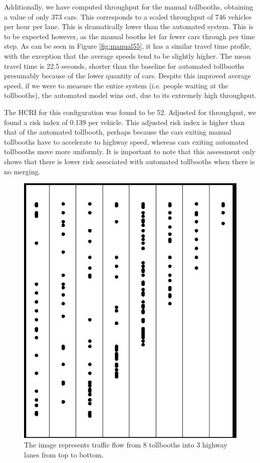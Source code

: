 \documentclass[a4paper, 11pt]{article}
\begin{document}
Additionally, we have computed throughput for the manual tollbooths, obtaining a value of only 373 cars. This corresponds to a scaled throughput of 746 vehicles per hour per lane. This is dramatically lower than the automated system. This is to be expected however, as the manual booths let far fewer cars through per time step. As can be seen in Figure \ref{fig:manual55}, it %
has a similar travel time profile, with the exception that the average speeds tend to be slightly higher. The mean travel time is 22.5 seconds, shorter than the baseline for automated tollbooths presumably because of the lower quantity of cars. Despite this improved average speed, if we were to measure the entire system (i.e. people waiting at the tollbooths), the automated model wins out, due to its extremely high throughput. 

The HCRI for this configuration was found to be 52. Adjusted for throughput, we found a risk index of 0.139 per vehicle. This adjusted risk index is higher than that of the automated tollbooth, perhaps because the cars exiting manual tollbooths have to accelerate to highway speed, whereas cars exiting automated tollbooths move more uniformly.
It is important to note that this assessment only shows that there is lower risk associated with automated tollbooths when there is no merging. 

\begin{figure}[H]
\begin{center}
\includegraphics[scale=0.203]{Images/3By8LeftOne.png}
\end{center}
\caption{The image represents traffic flow from 8 tollbooths into 3 highway lanes from top to bottom. }
\label{fig:3By8RightTri}
\end{figure}
\end{document}
